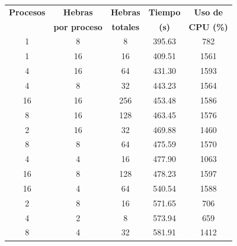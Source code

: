 \begin{table}[ht]
    \centering
    \small
    \setlength{\tabcolsep}{4pt}
    \renewcommand{\arraystretch}{1.1}
    \begin{tabular}{|c|c|c|c|c|}
        \hline
        \textbf{Procesos} & \textbf{Hebras}      & \textbf{Hebras}  & \textbf{Tiempo} & \textbf{Uso de}   \\
                          & \textbf{por proceso} & \textbf{totales} & \textbf{(s)}    & \textbf{CPU (\%)} \\
        \hline
        1                 & 8                    & 8                & 395.63          & 782               \\
        1                 & 16                   & 16               & 409.51          & 1561              \\
        4                 & 16                   & 64               & 431.30          & 1593              \\
        4                 & 8                    & 32               & 443.23          & 1564              \\
        16                & 16                   & 256              & 453.48          & 1586              \\
        8                 & 16                   & 128              & 463.45          & 1576              \\
        2                 & 16                   & 32               & 469.88          & 1460              \\
        8                 & 8                    & 64               & 475.59          & 1570              \\
        4                 & 4                    & 16               & 477.90          & 1063              \\
        16                & 8                    & 128              & 478.23          & 1597              \\
        16                & 4                    & 64               & 540.54          & 1588              \\
        2                 & 8                    & 16               & 571.65          & 706               \\
        4                 & 2                    & 8                & 573.94          & 659               \\
        8                 & 4                    & 32               & 581.91          & 1412              \\

\end{tabular}
\end{table}

